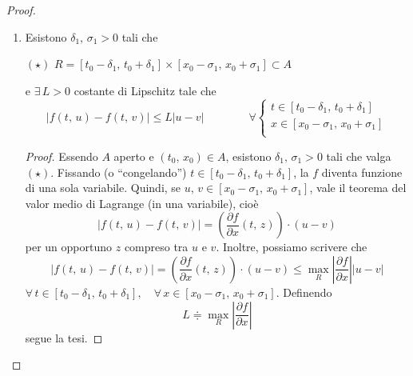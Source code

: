 \begin{proof}
\begin{enumerate}[labelindent=\parindent,leftmargin=*,label=\textnormal{\underline{Passo \arabic*}.},start=1]
\begin{proof}
$$\begin{array}{ccc}
	\rotatebox{270}{$=$} & & \\
	x(t) - x(t_0) & & \\
	\qquad \rotatebox{270}{$\overset{\rotatebox{90}{\tiny $\mathrm{(CI)}$}}{=}$} & & \\
	x(t) - x_0\\
	\end{array}
	$$
	cioè
	$$
	x(t) = x_0 + \int_{t_0}^t f(s,\,x(s)) \mathrm{d}s
	$$
	$(\Uparrow)$ Sia $x \in C^0([t_0-\delta,\,t_0+\delta])$ e supponiamo che
	$$
	G_x \subseteq A
	$$
	e
	$$
	x(t) = x_0 + \int_{t_0}^t f(s,\,x(s))\mathrm{d}s \qquad \forall t \in [t_0-\delta,\,t_0+\delta]
	$$
	La proprietà $G_x \subseteq A$, dunque, è gratis. Anche la $\mathrm{(CI)}$ è banale, poiché sostituendo $t_0$ a $t$, otteniamo
	$$
	\underline{x(t)} = x_0 + \cancelto{_0}{\int_{t_0}^{t_0} f(s,\,x(s))\mathrm{d}s} = \underline{x_0}
	$$
	Osserviamo che la funzione
	$$
	[t_0-\delta,\,t_0+\delta] \ni s \longmapsto f(s,\,x(s))
	$$
	è continua (perché composizione di funzioni continue). Per il teorema fondamentale del calcolo, quindi,
	$$
	x \in C^1([t_0-\delta,\,t_0+\delta]) \qquad \text{e vale } \mathrm{(E)}
	$$
	\end{proof}
	
	
	\item Esistono $\delta_1,\,\sigma_1 > 0$ tali che
	\begin{center}
	$\mathrm{(\star)}$
	\hfill
	$\displaystyle
	R = [t_0-\delta_1,\,t_0+\delta_1] \times [x_0-\sigma_1,\,x_0+\sigma_1] \subset A
	$
	\hfill \null \\
	\end{center}
	e $\exists \, L > 0$ costante di Lipschitz tale che
	$$
	|f(t,\,u) - f(t,\,v)| \leq L|u-v| \qquad\qquad \forall
	\begin{cases}
	t \in [t_0-\delta_1,\,t_0+\delta_1]\\
	x \in [x_0-\sigma_1,\,x_0+\sigma_1]\\
	\end{cases}
	$$
	\begin{proof}
	Essendo $A$ aperto e $(t_0,\,x_0) \in A$, esistono $\delta_1,\,\sigma_1 > 0$ tali che valga $\mathrm{(\star)}$. Fissando (o ``congelando'') $t \in [t_0-\delta_1,\,t_0+\delta_1]$, la $f$ diventa funzione di una sola variabile. Quindi, se $u,\,v \in [x_0-\sigma_1,\,x_0+\sigma_1]$, vale il teorema del valor medio di Lagrange (in una variabile), cioè
	$$
	|f(t,\,u) - f(t,\,v)| = \left(\dfrac{\partial f}{\partial x}(t,\,z)\right) \cdot (u-v)
	$$
	per un opportuno $z$ compreso tra $u$ e $v$. Inoltre, possiamo scrivere che
	$$
	|f(t,\,u) - f(t,\,v)| = \left(\dfrac{\partial f}{\partial x}(t,\,z)\right) \cdot (u-v) \leq
	\underset{R}{\max}\left| \dfrac{\partial f}{\partial x} \right||u-v|
	$$
	$\forall \, t \in [t_0-\delta_1,\,t_0+\delta_1], \quad \forall \, x \in [x_0-\sigma_1,\,x_0+\sigma_1]$. Definendo
	$$
	L \doteqdot \underset{R}{\max}\left| \dfrac{\partial f}{\partial x} \right|
	$$
	segue la tesi.
	\end{proof}
	

\end{enumerate}
\end{proof}
